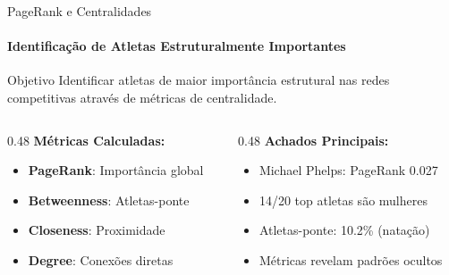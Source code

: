 \begin{frame}{PageRank e Centralidades}
    \framesubtitle{Identificação de Atletas Estruturalmente Importantes}
    \begin{block}{Objetivo}
        Identificar atletas de maior importância estrutural nas redes competitivas através de métricas de centralidade.
    \end{block}

    \begin{columns}[T]
        \begin{column}{0.48\textwidth}
            \textbf{Métricas Calculadas:}
            \begin{itemize}
                \item \textbf{PageRank}: Importância global
                \item \textbf{Betweenness}: Atletas-ponte
                \item \textbf{Closeness}: Proximidade
                \item \textbf{Degree}: Conexões diretas
            \end{itemize}
        \end{column}
        \begin{column}{0.48\textwidth}
            \textbf{Achados Principais:}
            \begin{itemize}
                \item Michael Phelps: PageRank 0.027
                \item 14/20 top atletas são mulheres
                \item Atletas-ponte: 10.2\% (natação)
                \item Métricas revelam padrões ocultos
            \end{itemize}
        \end{column}
    \end{columns}
\end{frame}

